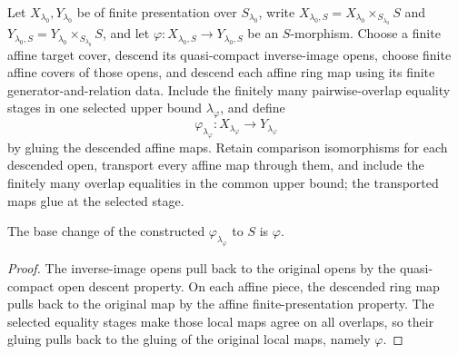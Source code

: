 \begin{definition}
  \label{def:nagata-morphism-descent}

  Let $X_{\lambda_0},Y_{\lambda_0}$ be of finite presentation over
  $S_{\lambda_0}$, write
  $X_{\lambda_0,S}=X_{\lambda_0}\times_{S_{\lambda_0}}S$ and
  $Y_{\lambda_0,S}=Y_{\lambda_0}\times_{S_{\lambda_0}}S$, and let
  $\varphi\colon X_{\lambda_0,S}\to Y_{\lambda_0,S}$ be an $S$-morphism.
  Choose a finite affine target cover, descend its quasi-compact inverse-image
  opens, choose finite affine covers of those opens, and descend each affine
  ring map using its finite generator-and-relation data.  Include the finitely
  many pairwise-overlap equality stages in one selected upper bound
  $\lambda_\varphi$, and define
  \[
    \varphi_{\lambda_\varphi}\colon
      X_{\lambda_\varphi}\longrightarrow Y_{\lambda_\varphi}
  \]
  by gluing the descended affine maps.
  Retain comparison isomorphisms for each descended open, transport every
  affine map through them, and include the finitely many overlap equalities in
  the common upper bound; the transported maps glue at the selected stage.
\end{definition}

\begin{lemma}
  \label{lemma:nagata-morphism-descends}

  The base change of the constructed
  $\varphi_{\lambda_\varphi}$ to $S$ is $\varphi$.
\end{lemma}

\begin{proof}
  The inverse-image opens pull back to the original opens by the quasi-compact
  open descent property.  On each affine piece, the descended ring map pulls
  back to the original map by the affine finite-presentation property.  The
  selected equality stages make those local maps agree on all overlaps, so
  their gluing pulls back to the gluing of the original local maps, namely
  $\varphi$.
\end{proof}

